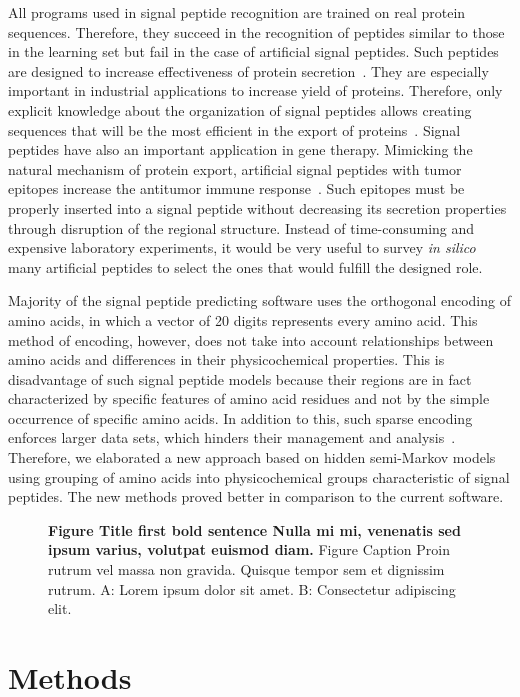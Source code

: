 \documentclass[10pt,letterpaper]{article}
\begin{document}
All programs used in signal peptide recognition are trained on real protein sequences. Therefore, they succeed in the recognition of peptides similar to those in the learning set but fail in the case of artificial signal peptides. Such peptides are designed to increase effectiveness of protein secretion~\cite{2010futatsumorisugaisignal}. They are especially important in industrial applications to increase yield of proteins. Therefore, only explicit knowledge about the organization of signal peptides allows creating sequences that will be the most efficient in the export of proteins~\cite{2013ngengineering}. Signal peptides have also an important application in gene therapy. Mimicking the natural mechanism of protein export, artificial signal peptides with tumor epitopes increase the antitumor immune response~\cite{2003heenhanced}. Such epitopes must be properly inserted into a signal peptide without decreasing its secretion properties through disruption of the regional structure. Instead of time-consuming and expensive laboratory experiments, it would be very useful to survey \textit{in silico} many artificial peptides to select the ones that would fulfill the designed role.

Majority of the signal peptide predicting software uses the orthogonal encoding of amino acids, in which a vector of 20 digits represents every amino acid. This method of encoding, however, does not take into account relationships between amino acids and differences in their physicochemical properties. This is disadvantage of such signal peptide models because their regions are in fact characterized by specific features of amino acid residues and not by the simple occurrence of specific amino acids. In addition to this, such sparse encoding enforces larger data sets, which hinders their management and analysis~\cite{2002linamino}. Therefore, we elaborated a new approach based on hidden semi-Markov models using grouping of amino acids into physicochemical groups characteristic of signal peptides. The new methods proved better in comparison to the current software.

\begin{figure}[h]
\caption{{\bf Figure Title first bold sentence Nulla mi mi, venenatis sed ipsum varius, volutpat euismod diam.}
Figure Caption Proin rutrum vel massa non gravida. Quisque tempor sem et dignissim rutrum. A: Lorem ipsum dolor sit amet. B: Consectetur adipiscing elit.}
\label{fig1}
\end{figure}

\section*{Methods}
\end{document}
